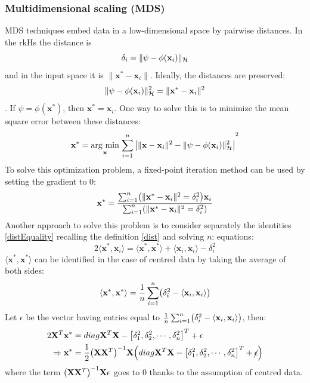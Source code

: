 \documentclass[12pt, letterpaper]{article}
\theoremstyle{definition}
\newcommand{\X}{\mathrm{\mathbf{X}}}
\newcommand{\x}{\mathbf{x}}
\DeclarePairedDelimiter\autobracket{(}{)}
\newcommand{\br}[1]{\autobracket*{#1}}
\newcommand{\argmin}[1]{\underset{#1}{\operatorname{arg}\,\operatorname{min}}\;}
\begin{document}
\subsubsection{Multidimensional scaling (MDS)}
MDS techniques embed data in a low-dimensional space by pairwise distances. In the rkHs the distance is 
\begin{equation}
\label{dist}
\delta_i = \|\psi- \phi(\x_i)\|_\CMcal{H}
\end{equation}
 and in the input space it is $\|\x^* - \x_i\|$. Ideally, the distances are preserved: 
 \begin{equation}
 \label{distEquality}
 \|\psi- \phi(\x_i)\|_\CMcal{H}^2 = \|\x^* - \x_i\|^2
 \end{equation}.
If $\psi = \phi(\x^*)$, then $\x^* = \x_i$. One way to solve this is to minimize the mean square error between these distances:
\begin{equation}
\x^* = \argmin{\x}{\sum_{i=1}^n \left| \|\x-\x_i\|^2 - \|\psi-\phi(\x_i) \|_\CMcal{H}^2 \right|}^2
\end{equation}
To solve this optimization problem, a fixed-point iteration method can be used by setting the gradient to $0$:
\begin{equation}
\x^* = \frac{\sum_{i=1}^n \br{\|\x^* - \x_i\|^2 = \delta_i^2}\x_i}{\sum_{i=1}^n \br{\|\x^* - \x_i\|^2 = \delta_i^2}}
\end{equation}
Another approach to solve this problem is to consider separately the identities \ref{distEquality} recalling the definition \ref{dist} and solving $n$:
 equations:
\begin{equation}
2\langle \x^*, \x_i\rangle=\langle \x^*, \x^*\rangle +\langle \x_i,  \x_i\rangle-\delta_i^2
\end{equation}
$\langle \x^*, \x^*\rangle $ can be identified in the case of centred data by taking the average of both sides:
\begin{equation}
\langle \x^*, \x^*\rangle  = \frac{1}{n}  \sum_{i=1}^n\br{\delta_i^2- \langle \x_i, \x_i\rangle }
\end{equation}
Let $\epsilon$ be the vector having entries equal to $\frac{1}{n}\sum_{i=1}^n\br{\delta_i^2-\langle \x_i, \x_i\rangle }$, then:
\begin{equation}
\begin{aligned}
2\X^T\x^* &= diag{\X^T \X} - \left[\delta_1^2, \delta_2^2, \cdots, \delta_n^2\right]^T+\epsilon\\
\Rightarrow \x^* &= \frac{1}{2}\br{\X\X^T}^{-1}\X\br{diag{\X^T \X} - \left[\delta_1^2, \delta_2^2, \cdots, \delta_n^2\right]^T+\cancel{\epsilon}}
\end{aligned}
\end{equation}
where the term $\br{\X\X^T}^{-1}\X\epsilon$ goes to $0$ thanks to the assumption of centred data.
\end{document}
